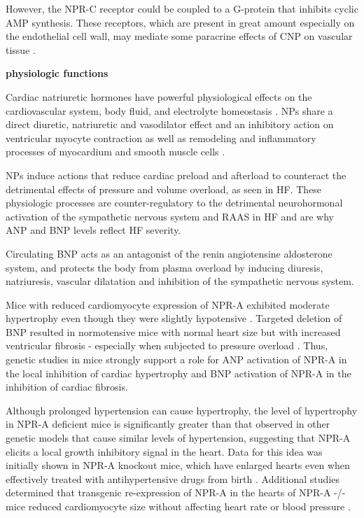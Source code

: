 \documentclass[14pt,a4paper,onecolumn]{extarticle}
\begin{document}
However, the NPR-C receptor could be coupled to a G-protein that inhibits cyclic AMP synthesis. These receptors, which are present in great amount especially on the endothelial cell wall, may mediate some paracrine effects of CNP on vascular tissue \citep{bib355}.

\textbf{physiologic functions}

Cardiac natriuretic hormones have powerful physiological effects on the cardiovascular system, body fluid, and electrolyte homeostasis \citep{28}. NPs share a direct diuretic, natriuretic and vasodilator effect and an inhibitory action on ventricular myocyte contraction \citep{79} as well as remodeling and inflammatory processes of myocardium and smooth muscle cells \citep{83}.

NPs induce actions that reduce cardiac preload and afterload to counteract the detrimental effects of pressure and volume overload, as seen in HF.  These physiologic processes are counter-regulatory to the detrimental neurohormonal activation of the sympathetic nervous system and RAAS in HF and are why ANP and BNP levels reflect HF severity. \citep{Potter2011} %

Circulating BNP acts as an antagonist of the renin angiotensine aldosterone system, and protects the body from plasma overload by inducing diuresis, natriuresis, vascular dilatation and inhibition of the sympathetic nervous system. \citep{Hall2005}


Mice with reduced cardiomyocyte expression of NPR-A exhibited moderate hypertrophy even though they were slightly hypotensive \citep{Holtwick2003} \citep{Patel2005}. Targeted deletion of BNP resulted in normotensive mice with normal heart size but with increased ventricular fibrosis - especially when subjected to pressure overload \citep{Tamura2000}. Thus, genetic studies in mice strongly support a role for ANP activation of NPR-A in the local inhibition of cardiac hypertrophy and BNP activation of NPR-A in the inhibition of cardiac fibrosis. %

Although prolonged hypertension can cause hypertrophy, the level of hypertrophy in NPR-A deficient mice is significantly greater than that observed in other genetic models that cause similar levels of hypertension, suggesting that NPR-A elicits a local growth inhibitory signal in the heart. Data for this idea was initially shown in NPR-A knockout mice, which have enlarged hearts even when effectively treated with antihypertensive drugs from birth \citep{Knowles2001}. Additional studies determined that transgenic re-expression of NPR-A in the hearts of NPR-A -/- mice reduced cardiomyocyte size without affecting heart rate or blood pressure \citep{Kishimoto2001}. %
\end{document}
